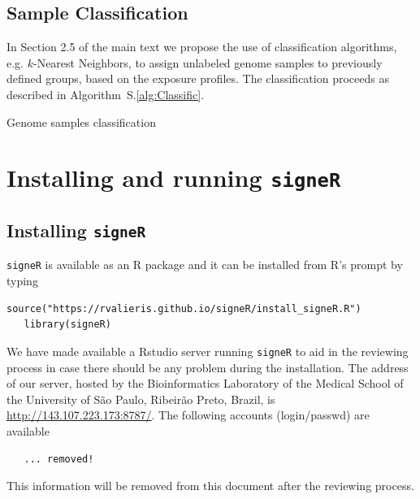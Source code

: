 \documentclass[11pt]{amsart}
\makeatletter
\def\BState{\State\hskip-\ALG@thistlm}
\theoremstyle{definition}
\makeatother
\begin{document}
\subsection{Sample Classification}
In Section 2.5 of the main text we propose the use of classification
algorithms, e.g. $k$-Nearest Neighbors, to assign unlabeled genome
samples to previously defined groups, based on the exposure profiles.
The classification proceeds as described in
Algorithm~S.\ref{alg:Classific}.

\begin{algorithm}
\caption{Genome samples classification}\label{alg:Classific}
\end{algorithm}


\section{Installing and running \texttt{signeR}}
\subsection{Installing \texttt{signeR}}
\texttt{signeR} is available as an R package and it can be installed
from R's prompt by typing
\begin{lstlisting}[]
   source("https://rvalieris.github.io/signeR/install_signeR.R")
   library(signeR)
\end{lstlisting}

We have made available a Rstudio server
running \texttt{signeR} to aid in the reviewing process  in case there
should be any problem during the installation. The address of our
server, hosted by the Bioinformatics Laboratory of the Medical School 
of the University of S\~ao Paulo, Ribeir\~ao Preto, Brazil, is 
\url{http://143.107.223.173:8787/}. The following accounts
(login/passwd) are available
\begin{lstlisting}
   ... removed!
\end{lstlisting}
This information will be removed from this document after the
reviewing process. 
\end{document}
